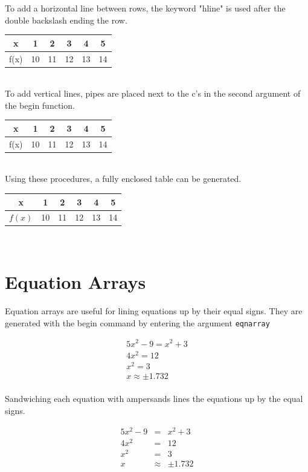 \documentclass[11pt]{article}
\begin{document}
To add a horizontal line between rows, the keyword "hline" is used after the double backslash ending the row. \\

\begin{tabular}{cccccc}
x & 1 & 2 & 3 & 4 & 5 \\ \hline
f(x) & 10 & 11 & 12 & 13 & 14 \\
\end{tabular} \\

To add vertical lines, pipes are placed next to the c's in the second argument of the begin function. \\

\begin{tabular}{c|c|c|c|c|c}
x & 1 & 2 & 3 & 4 & 5 \\ \hline
f(x) & 10 & 11 & 12 & 13 & 14 \\
\end{tabular} \\

Using these procedures, a fully enclosed table can be generated. \\

\begin{tabular}{|c|c|c|c|c|c|}
\hline
x & 1 & 2 & 3 & 4 & 5 \\ \hline
$f(x)$ & 10 & 11 & 12 & 13 & 14 \\ \hline
\end{tabular} \\

\section{Equation Arrays}

Equation arrays are useful for lining equations up by their equal signs. They are generated with the begin command by entering the argument \texttt{eqnarray}

\begin{eqnarray}
5x^2 - 9 = x^2 + 3 \\ 
4x^2 = 12 \\
x^2 = 3 \\
x\approx\pm{1.732}
\end{eqnarray} \\

Sandwiching each equation with ampersands lines the equations up by the equal signs.

\begin{eqnarray}
5x^2 - 9 &=& x^2 + 3 \\ 
4x^2 &=& 12 \\
x^2 &=& 3 \\
x&\approx&\pm{1.732}
\end{eqnarray} \\
\end{document}
